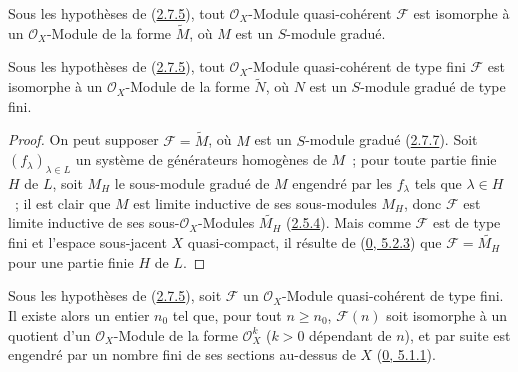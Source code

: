 \begin{corollary}[2.7.7]
\label{II.2.7.7-fr}
Sous les hypothèses de (\hyperref[II.2.7.5-fr]{2.7.5}), tout
$\mathcal{O}_X$-Module quasi-cohérent $\mathcal{F}$ est isomorphe à un
$\mathcal{O}_X$-Module de la forme $\widetilde{M}$, où $M$ est un $S$-module
gradué.
\end{corollary}

\begin{corollary}[2.7.8]
\label{II.2.7.8-fr}
Sous les hypothèses de (\hyperref[II.2.7.5-fr]{2.7.5}), tout
$\mathcal{O}_X$-Module quasi-cohérent de type fini $\mathcal{F}$ est
isomorphe à un $\mathcal{O}_X$-Module de la forme $\widetilde{N}$, où $N$ est
un $S$-module gradué de type fini.
\end{corollary}

\begin{proof}
On peut supposer $\mathcal{F}=\widetilde{M}$, où $M$ est un $S$-module gradué
(\hyperref[II.2.7.7-fr]{2.7.7}). Soit $(f_\lambda)_{\lambda\in L}$ un
système de générateurs homogènes de $M$~; pour toute partie finie $H$ de $L$,
soit $M_H$ le sous-module gradué de $M$ engendré par les $f_\lambda$ tels que
$\lambda\in H$~; il est clair que $M$ est limite inductive de ses sous-modules
$M_H$, donc $\mathcal{F}$ est limite inductive de ses sous-$\mathcal{O}_X$-Modules
$\widetilde{M_H}$ (\hyperref[II.2.5.4-fr]{2.5.4}). Mais comme $\mathcal{F}$
est de type fini et l'espace sous-jacent $X$ quasi-compact, il résulte de
(\hyperref[0.5.2.3-fr]{0, 5.2.3}) que $\mathcal{F}=\widetilde{M_H}$ pour une
partie finie $H$ de $L$.
\end{proof}

\begin{corollary}[2.7.9]
\label{II.2.7.9-fr}
Sous les hypothèses de (\hyperref[II.2.7.5-fr]{2.7.5}), soit $\mathcal{F}$ un
$\mathcal{O}_X$-Module quasi-cohérent de type fini. Il existe alors un entier
$n_0$ tel que, pour tout $n\geq n_0$, $\mathcal{F}(n)$ soit isomorphe à un
quotient d'un $\mathcal{O}_X$-Module de la forme $\mathcal{O}_X^k$ ($k>0$
dépendant de $n$), et par suite est engendré par un nombre fini de ses sections
au-dessus de $X$ (\hyperref[0.5.1.1-fr]{0, 5.1.1}).
\end{corollary}

